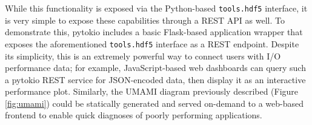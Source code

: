 While this functionality is exposed via the Python-based \texttt{tools.hdf5} interface, it is very simple to expose these capabilities through a REST API as well.
To demonstrate this, pytokio includes a basic Flask-based application wrapper that exposes the aforementioned \texttt{tools.hdf5} interface as a REST endpoint.
Despite its simplicity, this is an extremely powerful way to connect users with I/O performance data; for example, JavaScript-based web dashboards can query such a pytokio REST service for JSON-encoded data, then display it as an interactive performance plot.
Similarly, the UMAMI diagram previously described (Figure \ref{fig:umami}) could be statically generated and served on-demand to a web-based frontend to enable quick diagnoses of poorly performing applications.